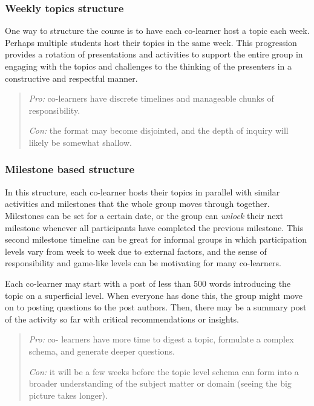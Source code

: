\subsubsection{Weekly topics structure}\label{weekly-topics-structure}

One way to structure the course is to have each co-learner host a topic
each week. Perhaps multiple students host their topics in the same week.
This progression provides a rotation of presentations and activities to
support the entire group in engaging with the topics and challenges to
the thinking of the presenters in a constructive and respectful manner.

\begin{quote}
\emph{Pro:} co-learners have discrete timelines and manageable chunks of
responsibility.

\emph{Con:} the format may become disjointed, and the depth of inquiry
will likely be somewhat shallow.
\end{quote}

\subsubsection{Milestone based
structure}\label{milestone-based-structure}

In this structure, each co-learner hosts their topics in parallel with
similar activities and milestones that the whole group moves through
together. Milestones can be set for a certain date, or the group can
\emph{unlock} their next milestone whenever all participants have
completed the previous milestone. This second milestone timeline can be
great for informal groups in which participation levels vary from week
to week due to external factors, and the sense of responsibility and
game-like levels can be motivating for many co-learners.

Each co-learner may start with a post of less than 500 words introducing
the topic on a superficial level. When everyone has done this, the group
might move on to posting questions to the post authors. Then, there may
be a summary post of the activity so far with critical recommendations
or insights.

\begin{quote}
\emph{Pro:} co- learners have more time to digest a topic, formulate a
complex schema, and generate deeper questions.

\emph{Con:} it will be a few weeks before the topic level schema can
form into a broader understanding of the subject matter or domain
(seeing the big picture takes longer).
\end{quote}

